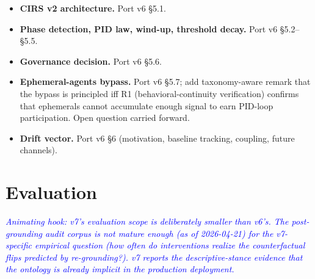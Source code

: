 \documentclass[11pt,twocolumn]{article}
\newcommand{\outlinenote}[1]{\textcolor{blue}{\textit{#1}}}
\begin{document}
\begin{itemize}
  \item \textbf{CIRS v2 architecture.} Port v6 §5.1.
  \item \textbf{Phase detection, PID law, wind-up, threshold decay.}
        Port v6 §5.2--§5.5.
  \item \textbf{Governance decision.} Port v6 §5.6.
  \item \textbf{Ephemeral-agents bypass.} Port v6 §5.7; add
        taxonomy-aware remark that the bypass is principled iff
        R1 (behavioral-continuity verification) confirms that
        ephemerals cannot accumulate enough signal to earn
        PID-loop participation. Open question carried forward.
  \item \textbf{Drift vector.} Port v6 §6 (motivation, baseline
        tracking, coupling, future channels).
\end{itemize}

\section{Evaluation}
\outlinenote{Animating hook: v7's evaluation scope is deliberately
smaller than v6's. The post-grounding audit corpus is not mature
enough (as of 2026-04-21) for the v7-specific empirical question
(how often do interventions realize the counterfactual flips
predicted by re-grounding?). v7 reports the descriptive-stance
evidence that the ontology is already implicit in the production
deployment.}
\end{document}
